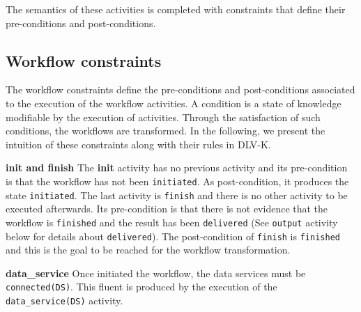%


\vspace*{0.25cm}			   
The semantics of these activities is completed with constraints that define their pre-conditions and post-conditions.
				
\subsection{Workflow constraints} 
The workflow constraints define the pre-conditions and post-conditions associated to the execution of the workflow activities. A condition is a state of knowledge modifiable by the execution of activities. Through the satisfaction of such conditions, the workflows are transformed.
In the following, we present the intuition of these constraints along with their rules in DLV-K.

\vspace*{0.25cm}              
\noindent\textbf{init and finish} The \textbf{init} activity has no previous activity and its pre-condition is that the workflow has not been \texttt{initiated}. As post-condition, it produces the state \texttt{initiated}. The last activity is \texttt{finish} and there is no other activity to be executed afterwards. Its pre-condition is that there is not evidence that the workflow is \texttt{finished} and the result has been \texttt{delivered} (See \texttt{output} activity below for details about \texttt{delivered}). The post-condition of \texttt{finish} is \texttt{finished} and this is the goal to be reached for the workflow transformation.
                            
%


\vspace*{0.25cm}        
\textbf{data\_service} Once initiated the workflow, the data services must be \texttt{connected(DS)}. This fluent is produced by the execution of the \texttt{data\_service(DS)} activity. 

%

